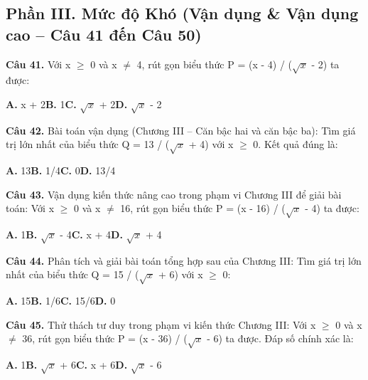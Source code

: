 \documentclass[11pt,a4paper]{article}
\begin{document}
\subsection*{\color{accent} Phần III. Mức độ Khó (Vận dụng \& Vận dụng cao -- Câu 41 đến Câu 50)}
\textbf{\color{primary} Câu 41.} Với x $\ge$ 0 và x $\ne$ 4, rút gọn biểu thức P = (x - 4) / ($\sqrt{x}$ - 2) ta được:\par
\hspace*{1.5em}\textbf{A.} x + 2\quad\quad \textbf{B.} 1\quad\quad \textbf{C.} $\sqrt{x}$ + 2\quad\quad \textbf{D.} $\sqrt{x}$ - 2\par\vspace{2pt}
\textbf{\color{primary} Câu 42.} Bài toán vận dụng (Chương III – Căn bậc hai và căn bậc ba): Tìm giá trị lớn nhất của biểu thức Q = 13 / ($\sqrt{x}$ + 4) với x $\ge$ 0. Kết quả đúng là:\par
\hspace*{1.5em}\textbf{A.} 13\quad\quad \textbf{B.} 1/4\quad\quad \textbf{C.} 0\quad\quad \textbf{D.} 13/4\par\vspace{2pt}
\textbf{\color{primary} Câu 43.} Vận dụng kiến thức nâng cao trong phạm vi Chương III để giải bài toán: Với x $\ge$ 0 và x $\ne$ 16, rút gọn biểu thức P = (x - 16) / ($\sqrt{x}$ - 4) ta được:\par
\hspace*{1.5em}\textbf{A.} 1\quad\quad \textbf{B.} $\sqrt{x}$ - 4\quad\quad \textbf{C.} x + 4\quad\quad \textbf{D.} $\sqrt{x}$ + 4\par\vspace{2pt}
\textbf{\color{primary} Câu 44.} Phân tích và giải bài toán tổng hợp sau của Chương III: Tìm giá trị lớn nhất của biểu thức Q = 15 / ($\sqrt{x}$ + 6) với x $\ge$ 0:\par
\hspace*{1.5em}\textbf{A.} 15\quad\quad \textbf{B.} 1/6\quad\quad \textbf{C.} 15/6\quad\quad \textbf{D.} 0\par\vspace{2pt}
\textbf{\color{primary} Câu 45.} Thử thách tư duy trong phạm vi kiến thức Chương III: Với x $\ge$ 0 và x $\ne$ 36, rút gọn biểu thức P = (x - 36) / ($\sqrt{x}$ - 6) ta được. Đáp số chính xác là:\par
\hspace*{1.5em}\textbf{A.} 1\quad\quad \textbf{B.} $\sqrt{x}$ + 6\quad\quad \textbf{C.} x + 6\quad\quad \textbf{D.} $\sqrt{x}$ - 6\par\vspace{2pt}
\end{document}
